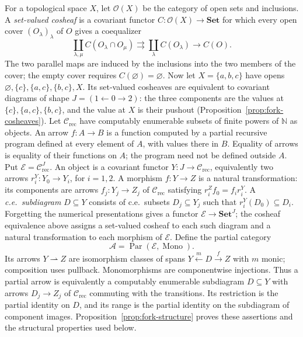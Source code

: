 \documentclass[11pt]{article}
\newcommand{\N}{\mathbb N}
\begin{document}
For a topological space $X$, let $\mathcal O(X)$ be the category
of open sets and inclusions. A \emph{set-valued cosheaf} is a
covariant functor $C:\mathcal O(X)\to\mathbf{Set}$ for which
every open cover $(O_\lambda)_\lambda$ of $O$ gives a coequalizer
\[
 \coprod_{\lambda,\mu} C(O_\lambda\cap O_\mu)
 \rightrightarrows \coprod_\lambda C(O_\lambda)
 \longrightarrow C(O).
\]
The two parallel maps are induced by the inclusions into the two
members of the cover; the empty cover requires
$C(\varnothing)=\varnothing$.
Now let $X=\{a,b,c\}$ have opens
$\varnothing,\{c\},\{a,c\},\{b,c\},X$.
Its set-valued cosheaves are equivalent to covariant diagrams of shape
$J=(1\leftarrow0\to2)$: the three components are the values at
$\{c\},\{a,c\},\{b,c\}$, and the value at $X$ is their pushout
(Proposition~\ref{prop:fork-cosheaves}).
Let $\mathcal C_{\mathrm{rec}}$ have computably enumerable subsets
of finite powers of $\N$ as objects. An arrow $f:A\to B$ is a
function computed by a partial recursive program defined at every
element of $A$, with values there in $B$. Equality of arrows is
equality of their functions on $A$; the program need not be defined
outside $A$.
Put $\mathcal E=\mathcal C_{\mathrm{rec}}^J$.
An object is a covariant functor $Y:J\to\mathcal C_{\mathrm{rec}}$,
equivalently two arrows $r_i^Y:Y_0\to Y_i$, for $i=1,2$.
A morphism $f:Y\to Z$ is a natural transformation: its components
are arrows $f_j:Y_j\to Z_j$ of $\mathcal C_{\mathrm{rec}}$ satisfying
$r_i^Zf_0=f_i r_i^Y$.
A \emph{c.e.\ subdiagram} $D\subseteq Y$ consists of c.e.\ subsets
$D_j\subseteq Y_j$ such that $r_i^Y(D_0)\subseteq D_i$.
Forgetting the numerical presentations gives a functor
$\mathcal E\to\mathbf{Set}^J$; the cosheaf equivalence above assigns
a set-valued cosheaf to each such diagram and a natural transformation
to each morphism of $\mathcal E$.
Define the partial category
\[
 \mathcal A=\operatorname{Par}(\mathcal E,\operatorname{Mono}).
\]
Its arrows $Y\rightharpoonup Z$ are isomorphism classes of spans
$Y\xleftarrow{m}D\xrightarrow{f}Z$ with $m$ monic; composition
uses pullback. Monomorphisms are componentwise injections.
Thus a partial arrow is equivalently a computably enumerable
subdiagram $D\subseteq Y$ with arrows $D_j\to Z_j$ of
$\mathcal C_{\mathrm{rec}}$ commuting with the transitions. Its
restriction is the partial identity on $D$, and its range is the
partial identity on the subdiagram of component images.
Proposition~\ref{prop:fork-structure} proves these assertions and
the structural properties used below.
\end{document}
